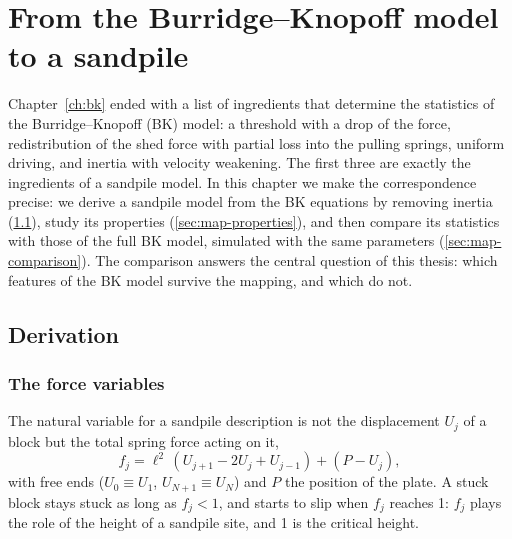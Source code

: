 \chapter{From the Burridge--Knopoff model to a sandpile}
\label{ch:mapping}



Chapter~\ref{ch:bk} ended with a list of ingredients that determine the statistics of the Burridge--Knopoff
(BK) model: a threshold with a drop of the force, redistribution of the shed force with partial loss into the
pulling springs, uniform driving, and inertia with velocity weakening. The first three are exactly the
ingredients of a sandpile model. In this chapter we make the correspondence precise: we derive a sandpile model
from the BK equations by removing inertia (\cref{sec:map-derivation}), study its properties
(\cref{sec:map-properties}), and then compare its statistics with those of the full BK model, simulated with the
same parameters (\cref{sec:map-comparison}). The comparison answers the central question of this thesis: which
features of the BK model survive the mapping, and which do not.

\section{Derivation}
\label{sec:map-derivation}

\subsection{The force variables}

The natural variable for a sandpile description is not the displacement $U_j$ of a block but the total spring force
acting on it,
\begin{equation}
  f_j = \ell^2\,(U_{j+1}-2U_j+U_{j-1}) + (P - U_j),
  \label{eq:fj}
\end{equation}
with free ends ($U_0\equiv U_1$, $U_{N+1}\equiv U_N$) and $P$ the position of the plate. A stuck block stays stuck as long as
$f_j<1$, and starts to slip when $f_j$ reaches 1: $f_j$ plays the role of the height of a sandpile site, and 1 is the critical
height.


